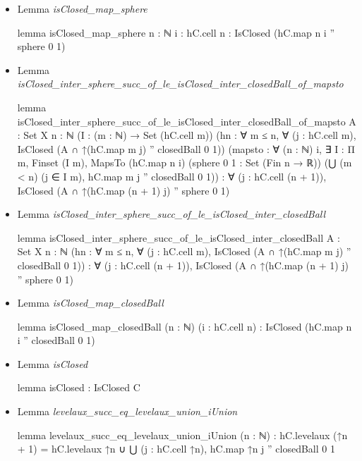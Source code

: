 \documentclass[colorinlistoftodos]{article}
\begin{document}
\begin{itemize}
\begin{leancode}
\end{leancode}
  \item Lemma \emph{isClosed\_map\_sphere}
\begin{leancode}
lemma isClosed_map_sphere {n : ℕ} {i : hC.cell n} : IsClosed (hC.map n i '' sphere 0 1)
\end{leancode}
  \item Lemma \emph{isClosed\_inter\_sphere\_succ\_of\_le\_isClosed\_inter\_closedBall\_of\_mapsto}
\begin{leancode}
lemma isClosed_inter_sphere_succ_of_le_isClosed_inter_closedBall_of_mapsto
{A : Set X} {n : ℕ} (I : (m : ℕ) → Set (hC.cell m))
(hn : ∀ m ≤ n, ∀ (j : hC.cell m), IsClosed (A ∩ ↑(hC.map m j) '' closedBall 0 1))
(mapsto : ∀ (n : ℕ) i, ∃ I : Π m, Finset (I m),
MapsTo (hC.map n i) (sphere 0 1 : Set (Fin n → ℝ))
(⋃ (m < n) (j ∈ I m), hC.map m j '' closedBall 0 1)) :
  ∀ (j : hC.cell (n + 1)), IsClosed (A ∩ ↑(hC.map (n + 1) j) '' sphere 0 1)
\end{leancode}
  \item Lemma \emph{isClosed\_inter\_sphere\_succ\_of\_le\_isClosed\_inter\_closedBall}
\begin{leancode}
  lemma isClosed_inter_sphere_succ_of_le_isClosed_inter_closedBall
  {A : Set X} {n : ℕ}
  (hn : ∀ m ≤ n, ∀ (j : hC.cell m), IsClosed (A ∩ ↑(hC.map m j) '' closedBall 0 1)) : 
  ∀ (j : hC.cell (n + 1)), IsClosed (A ∩ ↑(hC.map (n + 1) j) '' sphere 0 1)
\end{leancode}
  \item Lemma \emph{isClosed\_map\_closedBall}
\begin{leancode}
lemma isClosed_map_closedBall (n : ℕ) (i : hC.cell n) : 
  IsClosed (hC.map n i '' closedBall 0 1)
\end{leancode}
  \item Lemma \emph{isClosed}
\begin{leancode}
lemma isClosed : IsClosed C
\end{leancode}
  \item Lemma \emph{levelaux\_succ\_eq\_levelaux\_union\_iUnion}
\begin{leancode}
lemma levelaux_succ_eq_levelaux_union_iUnion (n : ℕ) : 
  hC.levelaux (↑n + 1) = hC.levelaux ↑n ∪ ⋃ (j : hC.cell ↑n), hC.map ↑n j '' closedBall 0 1

\end{leancode}
\end{itemize}
\end{document}
